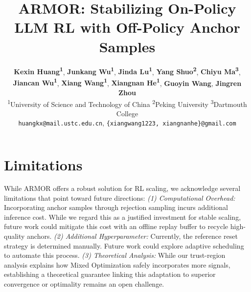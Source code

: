 \documentclass[11pt]{article}
\title{ARMOR: Stabilizing On-Policy LLM RL with Off-Policy Anchor Samples}
\author{
 \textbf{Kexin Huang\textsuperscript{1}},
 \textbf{Junkang Wu\textsuperscript{1}},
 \textbf{Jinda Lu\textsuperscript{1}},
 \textbf{Yang Shuo\textsuperscript{2}},
 \textbf{Chiyu Ma\textsuperscript{3}},\\
 \textbf{Jiancan Wu\textsuperscript{1}},
 \textbf{Xiang Wang\textsuperscript{1}},
 \textbf{Xiangnan He\textsuperscript{1}},
 \textbf{Guoyin Wang},
 \textbf{Jingren Zhou}
\\
 \textsuperscript{1}University of Science and Technology of China
 \hspace{10pt}
 \textsuperscript{2}Peking University
 \hspace{10pt}
 \textsuperscript{3}Dartmouth College
\\
\texttt{huangkx@mail.ustc.edu.cn},
\texttt{\{xiangwang1223, xiangnanhe\}@gmail.com}
}
\begin{document}
\maketitle










\newpage
\section*{Limitations}
While ARMOR offers a robust solution for RL scaling, we acknowledge several limitations that point toward future directions:
\textit{(1) Computational Overhead:} Incorporating anchor samples through rejection sampling incurs additional inference cost.
While we regard this as a justified investment for stable scaling, future work could mitigate this cost with an offline replay buffer to recycle high-quality anchors.
\textit{(2) Additional Hyperparameter:} Currently, the reference reset strategy is determined manually. 
Future work could explore adaptive scheduling to automate this process.
\textit{(3) Theoretical Analysis:} While our trust-region analysis explains how Mixed Optimization safely incorporates more signals, establishing a theoretical guarantee linking this adaptation to superior convergence or optimality remains an open challenge.

%



\newpage
\appendix



\end{document}
